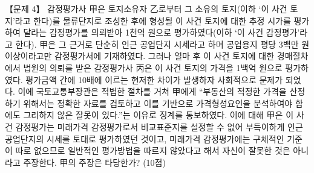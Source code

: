 \begin{longquestion}{【문제 4】}
감정평가사 甲은 토지소유자 乙로부터 그 소유의 토지(이하 ‘이 사건 토지’라고 한다)를 물류단지로 조성한 후에 형성될 이 사건 토지에 대한 추정 시가를 평가하여 달라는 감정평가를 의뢰받아 1천억 원으로 평가하였다(이하 ‘이 사건 감정평가’라고 한다). 甲은 그 근거로 단순히 인근 공업단지 시세라고 하며 공업용지 평당 3백만 원 이상이라고만 감정평가서에 기재하였다. 그러나 얼마 후 이 사건 토지에 대한 경매절차에서 법원의 의뢰를 받은 감정평가사 丙은 이 사건 토지의 가격을 1백억 원으로 평가하였다. 평가금액 간에 10배에 이르는 현저한 차이가 발생하자 사회적으로 문제가 되었다. 이에 국토교통부장관은 적법한 절차를 거쳐 甲에게 “부동산의 적정한 가격을 산정하기 위해서는 정확한 자료를 검토하고 이를 기반으로 가격형성요인을 분석하여야 함에도 그리하지 않은 잘못이 있다.”는 이유로 징계를 통보하였다. 이에 대해 甲은 이 사건 감정평가는 미래가격 감정평가로서 비교표준지를 설정할 수 없어 부득이하게 인근 공업단지의 시세를 토대로 평가하였던 것이고, 미래가격 감정평가에는 구체적인 기준이 따로 없으므로 일반적인 평가방법을 따르지 않았다고 해서 자신이 잘못한 것은 아니라고 주장한다. 甲의 주장은 타당한가? (10점) \par
\end{longquestion}

